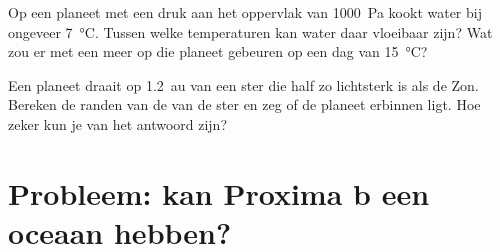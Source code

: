 \begin{exercise}[$\star\star\star$]\label{exo:g10:habitable-planet:14}
Op een planeet met een druk aan het oppervlak van \qty{1000}{Pa} kookt water bij
ongeveer \qty{7}{\degreeCelsius}. Tussen welke temperaturen kan water daar
vloeibaar zijn? Wat zou er met een meer op die planeet gebeuren op een dag van
\qty{15}{\degreeCelsius}?
\end{exercise}

\begin{exercise}[$\star\star\star$]\label{exo:g10:habitable-planet:15}
Een planeet draait op \qty{1.2}{au} van een ster die half zo lichtsterk is als
de Zon. Bereken de randen van de  van de ster en zeg of de planeet
erbinnen ligt. Hoe zeker kun je van het antwoord zijn?
\end{exercise}

\section{Probleem: kan Proxima b een oceaan hebben?}

